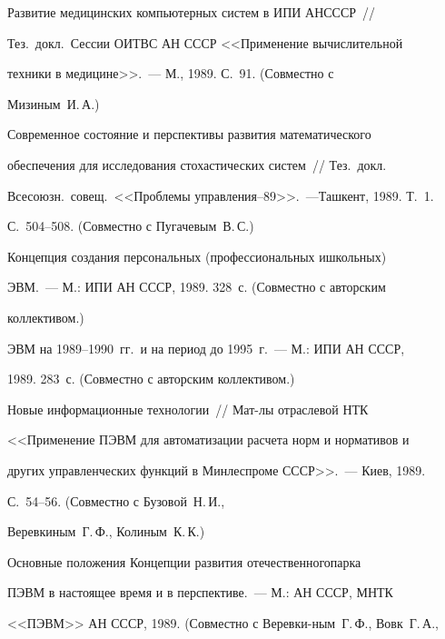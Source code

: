  Развитие медицинских компьютерных систем в ИПИ АН\linebreak СССР~//


Тез.\ докл.\ Сессии ОИТВС АН СССР <<Применение вычислительной


техники в медицине>>.~--- М., 1989. С.~91. (Совместно с


Мизиным~И.\,А.)


\pagebreak





 Современное состояние и перспективы развития математического


обеспечения для исследования стохастических систем~// Тез.\ докл.\


Всесоюзн.\ совещ.\ <<Проблемы управления--89>>.~---\linebreak Ташкент, 1989. Т.~1.


С.~504--508. (Совместно с Пугачевым~В.\,С.)





 Концепция создания персональных (профессиональных и\linebreak школьных)


ЭВМ.~--- М.: ИПИ АН СССР, 1989. 328~с. (Совместно с авторским


коллективом.)





 ЭВМ на 1989--1990~гг.\ и на период до 1995~г.~--- М.: ИПИ АН СССР,


1989. 283~с. (Совместно с авторским коллективом.)





 Новые информационные технологии~// Мат-лы отраслевой НТК


<<Применение ПЭВМ для автоматизации расчета норм и нормативов и


других управленческих функций в Минлеспроме СССР>>.~--- Киев, 1989.


С.~54--56. (Совместно с Бузовой~Н.\,И.,


Веревкиным~Г.\,Ф., Колиным~К.\,К.)





 Основные положения Концепции развития отечественного\linebreak парка


ПЭВМ в настоящее время и в перспективе.~--- М.: АН СССР, МНТК


<<ПЭВМ>> АН СССР, 1989. (Совместно с Веревки-\linebreak ным~Г.\,Ф., Вовк~Г.\,А.,


